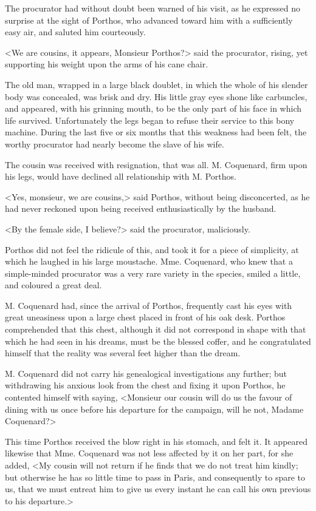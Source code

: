 The procurator had without doubt been warned of his visit, as he expressed no surprise at the sight of Porthos, who advanced toward him with a sufficiently easy air, and saluted him courteously. 

<We are cousins, it appears, Monsieur Porthos?> said the procurator, rising, yet supporting his weight upon the arms of his cane chair. 

The old man, wrapped in a large black doublet, in which the whole of his slender body was concealed, was brisk and dry. His little gray eyes shone like carbuncles, and appeared, with his grinning mouth, to be the only part of his face in which life survived. Unfortunately the legs began to refuse their service to this bony machine. During the last five or six months that this weakness had been felt, the worthy procurator had nearly become the slave of his wife. 

The cousin was received with resignation, that was all. M. Coquenard, firm upon his legs, would have declined all relationship with M. Porthos. 

<Yes, monsieur, we are cousins,> said Porthos, without being disconcerted, as he had never reckoned upon being received enthusiastically by the husband. 

<By the female side, I believe?> said the procurator, maliciously. 

Porthos did not feel the ridicule of this, and took it for a piece of simplicity, at which he laughed in his large moustache. Mme. Coquenard, who knew that a simple-minded procurator was a very rare variety in the species, smiled a little, and coloured a great deal. 

M. Coquenard had, since the arrival of Porthos, frequently cast his eyes with great uneasiness upon a large chest placed in front of his oak desk. Porthos comprehended that this chest, although it did not correspond in shape with that which he had seen in his dreams, must be the blessed coffer, and he congratulated himself that the reality was several feet higher than the dream. 

M. Coquenard did not carry his genealogical investigations any further; but withdrawing his anxious look from the chest and fixing it upon Porthos, he contented himself with saying, <Monsieur our cousin will do us the favour of dining with us once before his departure for the campaign, will he not, Madame Coquenard?> 

This time Porthos received the blow right in his stomach, and felt it. It appeared likewise that Mme. Coquenard was not less affected by it on her part, for she added, <My cousin will not return if he finds that we do not treat him kindly; but otherwise he has so little time to pass in Paris, and consequently to spare to us, that we must entreat him to give us every instant he can call his own previous to his departure.> 

